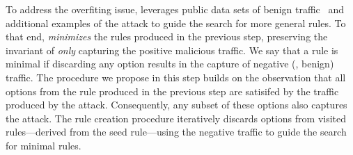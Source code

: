 \documentclass[sigconf,review, anonymous]{acmart}
\begin{document}

To address the overfiting issue, \tname{} leverages public data sets
of benign traffic~\cite{tcpreplay} and additional examples of the
attack to guide the search for more general rules. To that end,
\tname{} \emph{minimizes} the rules produced in the previous step,
preserving the invariant of \emph{only} capturing the positive
malicious traffic. We say that a rule is minimal if discarding any
option results in the capture of negative (\ie{}, benign) traffic.
The procedure we propose in this step builds on the observation that
all options from the rule produced in the previous step are satisifed
by the traffic produced by the attack. Consequently, any subset of
these options also captures the attack. The rule creation procedure
iteratively discards options from visited rules---derived from the
seed rule---using the negative traffic to guide the search for minimal
rules.
\end{document}
